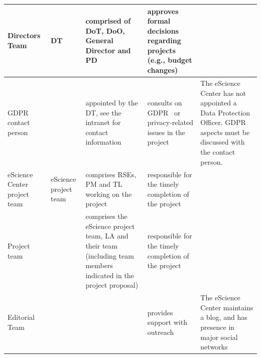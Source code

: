 \documentclass[11pt]{article}
\begin{document}
\begin{tabularx}{\linewidth}{p{}|p{}|p{}|p{}|p{}}
Directors Team                                     & DT                    & comprised of DoT, DoO, General Director and PD                                                                    & approves formal decisions regarding projects (e.g., budget changes)                                                                                                                                                                    &                                                                                                                                      \\\hline
GDPR contact person                                &                       & appointed by the DT, see the intranet for contact information                                                     & consults on GDPR~\cite{GDPR} or privacy-related issues in the project                                                                                                                                                                             & The eScience Center has not appointed a Data Protection Officer. GDPR aspects must be discussed with the contact person.             \\\hline
eScience Center project team                       & eScience project team & comprises RSEs, PM and TL working on the project                                                                  & responsible for the timely completion of the project                                                                                                                                                                                   &                                                                                                                                      \\\hline
Project team                                       &                       & comprises the eScience project team, LA and their team (including team members indicated in the project proposal) & responsible for the timely completion of the project                                                                                                                                                                                   &                                                                                                                                      \\\hline
Editorial Team                                     &                       &                                                                                                                   & provides support with outreach                                                                                                                                                                                                         & The eScience Center maintains a blog, and has presence in major social networks                                                     
\end{tabularx}
\end{document}
